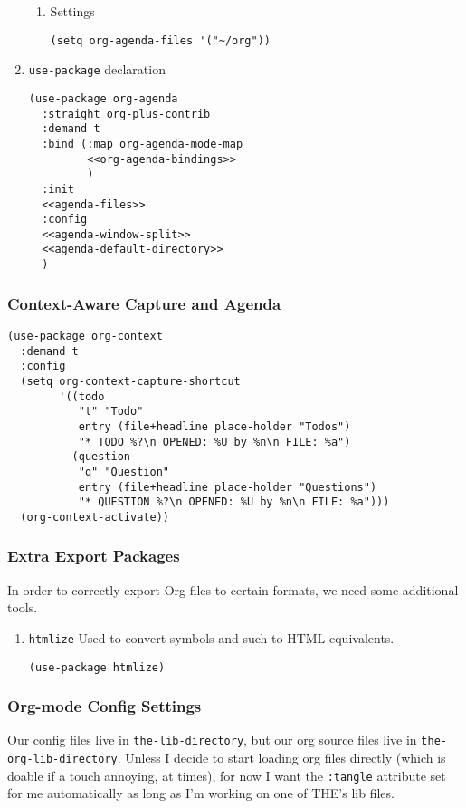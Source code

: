 \documentclass[11pt]{article}
\begin{document}
\begin{enumerate}
\begin{enumerate}
\item Settings
\label{sec:orgc4e0393}
\begin{verbatim}
(setq org-agenda-files '("~/org"))
\end{verbatim}
\end{enumerate}
\item \texttt{use-package} declaration
\label{sec:org7cceb22}
\begin{verbatim}
(use-package org-agenda
  :straight org-plus-contrib
  :demand t
  :bind (:map org-agenda-mode-map
         <<org-agenda-bindings>>
         )
  :init
  <<agenda-files>>
  :config
  <<agenda-window-split>>
  <<agenda-default-directory>>
  )
\end{verbatim}
\end{enumerate}

\subsubsection{Context-Aware Capture and Agenda}
\label{sec:org896564e}
\begin{verbatim}
(use-package org-context
  :demand t
  :config
  (setq org-context-capture-shortcut
        '((todo
           "t" "Todo"
           entry (file+headline place-holder "Todos")
           "* TODO %?\n OPENED: %U by %n\n FILE: %a")
          (question
           "q" "Question"
           entry (file+headline place-holder "Questions")
           "* QUESTION %?\n OPENED: %U by %n\n FILE: %a")))
  (org-context-activate))
\end{verbatim}
\subsubsection{Extra Export Packages}
\label{sec:org7dbf098}
In order to correctly export Org files to certain formats, we need
some additional tools.
\begin{enumerate}
\item \texttt{htmlize}
\label{sec:org2335609}
Used to convert symbols and such to HTML equivalents.
\begin{verbatim}
(use-package htmlize)
\end{verbatim}
\end{enumerate}
\subsubsection{Org-mode Config Settings}
\label{sec:org0701d65}
Our config files live in \texttt{the-lib-directory}, but our org source files
live in \texttt{the-org-lib-directory}. Unless I decide to start loading org
files directly (which is doable if a touch annoying, at times), for
now I want the \texttt{:tangle} attribute set for me automatically as long as
I'm working on one of THE's lib files.
\end{document}
